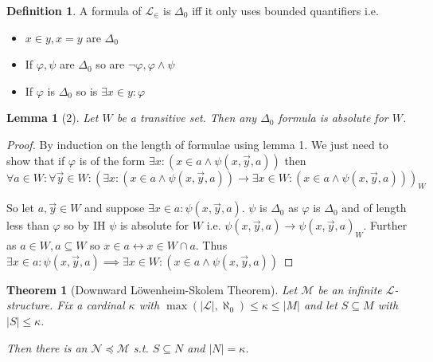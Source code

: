 \documentclass{scrartcl}
\renewcommand{\L}{\mathcal{L}}
\newcommand{\Le}{\L_\in}
\theoremstyle{definition}
\newtheorem*{definition*}{Definition}
\theoremstyle{plain}
\newtheorem*{lemma*}{Lemma}
\newtheorem*{theorem*}{Theorem}
\theoremstyle{remark}
\begin{document}
	\begin{definition*}
		A formula of $\Le$ is $\Delta_0$ iff it only uses bounded quantifiers i.e. 
		\begin{itemize}
			\item $x \in y, x = y$ are $\Delta_0$
			
			\item If $\varphi, \psi$ are $\Delta_0$ so are $\lnot \varphi, \varphi \land \psi$
			
			\item If $\varphi$ is $\Delta_0$ so is $\exists x \in y: \varphi$
		\end{itemize}
	\end{definition*}

	\begin{lemma*}[2]
		Let $W$ be a transitive set. Then any $\Delta_0$ formula is absolute for $W$.
	\end{lemma*}
	
	\begin{proof}
		By induction on the length of formulae using lemma 1.  We just need to show that if $\varphi$ is of the form $\exists x: (x \in a \land \psi(x, \vec{y}, a))$ then $\forall a \in W: \forall \vec{y} \in W: (\exists x: (x \in a \land \psi(x, \vec{y}, a)) \longrightarrow \exists x \in W: (x \in a \land \psi(x, \vec{y}, a)))_W$
		
		So let $a, \vec{y} \in W$ and suppose $\exists x \in a: \psi(x, \vec{y}, a)$. $\psi$ is $\Delta_0$ as $\varphi$ is $\Delta_0$ and of length less than $\varphi$ so by IH $\psi$ is absolute for $W$ i.e. $\psi(x, \vec{y}, a) \longrightarrow \psi(x, \vec{y}, a)_W$. Further as $a \in W, a \subseteq W$ so $x \in a \longleftrightarrow x \in W \cap a$. Thus $\exists x \in a: \psi(x, \vec{y}, a) \implies \exists x \in W: (x \in a\land \psi(x, \vec{y}, a))$
	\end{proof}

	\begin{theorem*}[Downward Löwenheim-Skolem Theorem]
		Let $\mathcal{M}$ be an infinite $\L$-structure. Fix a cardinal $\kappa$ with $\max(|\L|, \aleph_0) \leq \kappa \leq |M|$ and let $S \subseteq M$ with $|S| \leq \kappa$.
		
		Then there is an $\mathcal{N} \preceq \mathcal{M}$ s.t. $S \subseteq N$ and $|N| = \kappa$.
	\end{theorem*}
\end{document}
